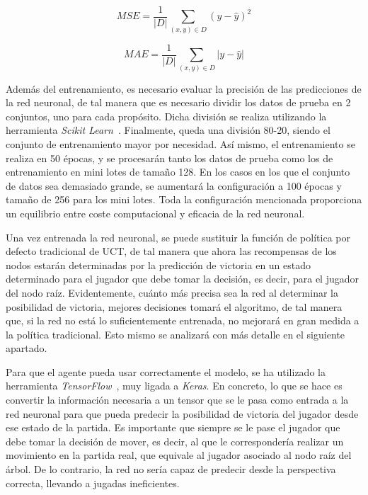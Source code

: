 \documentclass[conference,a4paper]{IEEEtran}
\begin{document}
\begin{equation}
  \label{eq:mse}
  MSE = \frac{1}{|D|} \sum_{(x,y) \in D} (y - \hat{y})^2
\end{equation}

\begin{equation}
  \label{eq:mae}
  MAE = \frac{1}{|D|} \sum_{(x,y) \in D} |y - \hat{y}|
\end{equation}

Además del entrenamiento, es necesario evaluar la precisión de las predicciones de la red neuronal, de tal manera que es necesario dividir 
los datos de prueba en 2 conjuntos, uno para cada propósito. Dicha división se realiza utilizando la herramienta \emph{Scikit Learn}~\cite{b14}. 
Finalmente, queda una división 80-20, siendo el conjunto de entrenamiento mayor por necesidad. Así mismo, el entrenamiento se realiza en 50 épocas, 
y se procesarán tanto los datos de prueba como los de entrenamiento en mini lotes de tamaño 128. En los casos en los que el conjunto de datos sea 
demasiado grande, se aumentará la configuración a 100 épocas y tamaño de 256 para los mini lotes. Toda la configuración mencionada proporciona un 
equilibrio entre coste computacional y eficacia de la red neuronal.

Una vez entrenada la red neuronal, se puede sustituir la función de política por defecto tradicional de UCT, de tal manera que ahora las 
recompensas de los nodos estarán determinadas por la predicción de victoria en un estado determinado para el jugador que debe tomar la decisión, 
es decir, para el jugador del nodo raíz. Evidentemente, cuánto más precisa sea la red al determinar la posibilidad de victoria, 
mejores decisiones tomará el algoritmo, de tal manera que, si la red no está lo suficientemente entrenada, no mejorará en gran medida a la política 
tradicional. Esto mismo se analizará con más detalle en el siguiente apartado.

Para que el agente pueda usar correctamente el modelo, se ha utilizado la herramienta \emph{TensorFlow}~\cite{b15}, muy ligada a \emph{Keras}. 
En concreto, lo que se hace es convertir la información necesaria a un tensor que se le pasa como entrada a la red neuronal 
para que pueda predecir la posibilidad de victoria del jugador desde ese estado de la partida. Es importante que siempre se 
le pase el jugador que debe tomar la decisión de mover, es decir, al que le correspondería realizar un movimiento en la partida real, 
que equivale al jugador asociado al nodo raíz del árbol. De lo contrario, la red no sería capaz de predecir desde la perspectiva 
correcta, llevando a jugadas ineficientes.
\end{document}
